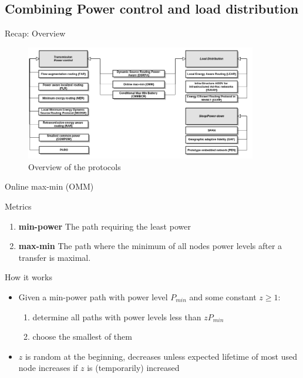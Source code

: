 \documentclass{beamer}
\begin{document}
\subsection{Combining Power control and load distribution}
\begin{frame}{Recap: Overview}
\begin{figure}
  \centering
  \includegraphics[width=0.9\textwidth]{images/overview}
  \caption{Overview of the protocols}
  
\end{figure}
\end{frame}
\begin{frame}{Online max-min (OMM)\cite{li2001online}}
\begin{block}{Metrics}
    \begin{enumerate}
        \item \textbf{min-power} The path requiring the least power
        \item \textbf{max-min} The path where the minimum of all nodes power levels after a transfer is maximal.
    \end{enumerate}
\end{block}

\begin{block}{How it works}
    \begin{itemize}
        \item Given a min-power path with power level $P_{min}$ and some constant $z \ge 1$:
         \begin{enumerate}
             \item  determine all paths with power levels less than $zP_{min}$
             \item choose the smallest of them
         \end{enumerate}
        \item $z$ is random at the beginning, decreases unless expected lifetime of most used node increases if $z$ is (temporarily) increased
    \end{itemize}
\end{block}
\end{frame}
\end{document}
